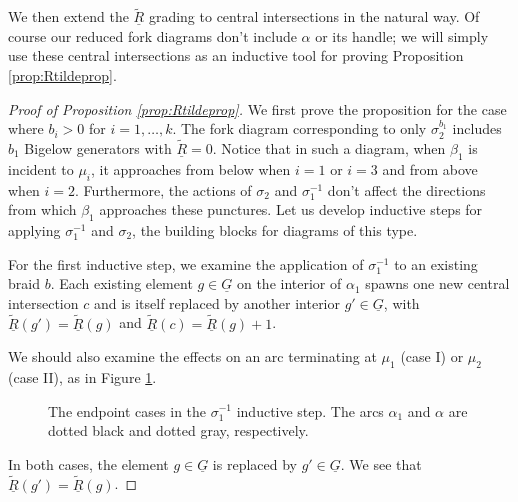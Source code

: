 \documentclass[11pt]{article}
\theoremstyle{plain} \newtheorem{thm}{Theorem}[subsection]
\theoremstyle{plain} \newtheorem{cor}[thm]{Corollary}
\theoremstyle{plain} \newtheorem{prop}[thm]{Proposition}
\theoremstyle{plain} \newtheorem{conj}[thm]{Conjecture}
\theoremstyle{plain} \newtheorem{lem}[thm]{Lemma}
\theoremstyle{definition} \newtheorem{df}[thm]{Definition}
\theoremstyle{remark} \newtheorem{rmk}[thm]{Remark}
\theoremstyle{remark} \newtheorem{obs}[thm]{Observation}
\newcommand{\Gtr}{\underline{G}}
\newcommand{\tld}[1]{\widetilde{#1}}
\newcommand{\red}[1]{\underline{#1}}
\numberwithin{equation}{section}
\begin{document}
We then extend the $\red{\tld{R}}$ grading to central intersections in the natural way.  Of course our reduced fork diagrams don't include $\alpha$ or its handle; we will simply use these central intersections as an inductive tool for proving Proposition \ref{prop:Rtildeprop}.

\begin{proof}[Proof of Proposition \ref{prop:Rtildeprop}]

We first prove the proposition for the case where $b_{i} > 0$ for $i = 1, \ldots, k$.  The fork diagram corresponding to only $\sigma_{2}^{b_{1}}$ includes $b_{1}$ Bigelow generators with $\red{\tld{R}} = 0$.  Notice that in such a diagram, when $\beta_{1}$ is incident to $\mu_{i}$, it approaches from below when $i=1$ or $i=3$ and from above when $i=2$.  Furthermore, the actions of $\sigma_{2}$ and $\sigma_{1}^{-1}$ don't affect the directions from which $\beta_1$ approaches these punctures.  Let us develop inductive steps for applying $\sigma_{1}^{-1}$ and $\sigma_{2}$, the building blocks for diagrams of this type.

For the first inductive step, we examine the application of $\sigma_{1}^{-1}$ to an existing braid $b$.  Each existing element $g \in \Gtr$ on the interior of $\alpha_{1}$ spawns one new central intersection $c$ and is itself replaced by another interior $g' \in \Gtr$, with $\red{\tld{R}}(g') = \red{\tld{R}}(g)$ and $\red{\tld{R}}(c) = \red{\tld{R}}(g) + 1$.

We should also examine the effects on an arc terminating at $\mu_{1}$ (case I) or $\mu_{2}$ (case II), as in Figure \ref{fig:sigma1cases}.

\begin{figure}[h]
\centering
{}
\caption[The endpoint cases in the $\sigma_{1}^{-1}$ inductive step in the proof of Proposition \ref{prop:Rtildeprop}]{The endpoint cases in the $\sigma_{1}^{-1}$ inductive step.  The arcs $\alpha_{1}$ and $\alpha$ are dotted black and dotted gray, respectively.}
\label{fig:sigma1cases}
\end{figure}
In both cases, the element $g \in \Gtr$ is replaced by $g' \in \Gtr$.  We see that $\red{\tld{R}}(g') = \red{\tld{R}}(g)$.


\end{proof}
\end{document}
